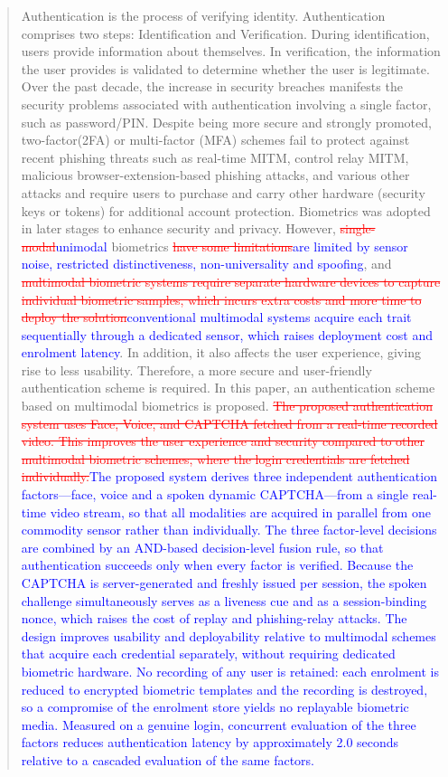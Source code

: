 \documentclass[10pt,journal,compsoc]{IEEEtran}
\begin{document}
\begin{@twocolumnfalse}
\begin{abstract}
    Authentication is the process of verifying identity. Authentication comprises two steps: Identification and Verification. During identification, users provide information about themselves. In verification, the information the user provides is validated to determine whether the user is legitimate. Over the past decade, the increase in security breaches manifests the security problems associated with authentication involving a single factor, such as password/PIN. Despite being more secure and strongly promoted, two-factor(2FA) or multi-factor (MFA) schemes fail to protect against recent phishing threats such as real-time MITM, control relay MITM, malicious browser-extension-based phishing attacks, and various other attacks and require users to purchase and carry other hardware (security keys or tokens) for additional account protection. Biometrics was adopted in later stages to enhance security and privacy. However, \textcolor{red}{\sout{single-modal}}\textcolor{blue}{unimodal} biometrics \textcolor{red}{\sout{have some limitations}}\textcolor{blue}{are limited by sensor noise, restricted distinctiveness, non-universality and spoofing}, and \textcolor{red}{\sout{multimodal biometric systems require separate hardware devices to capture individual biometric samples, which incurs extra costs and more time to deploy the solution}}\textcolor{blue}{conventional multimodal systems acquire each trait sequentially through a dedicated sensor, which raises deployment cost and enrolment latency}. In addition, it also affects the user experience, giving rise to less usability. Therefore, a more secure and user-friendly authentication scheme is required. In this paper, an authentication scheme based on multimodal biometrics is proposed. \textcolor{red}{\sout{The proposed authentication system uses Face, Voice, and CAPTCHA fetched from a real-time recorded video. This improves the user experience and security compared to other multimodal biometric schemes, where the login credentials are fetched individually.}}\textcolor{blue}{The proposed system derives three independent authentication factors---face, voice and a spoken dynamic CAPTCHA---from a single real-time video stream, so that all modalities are acquired in parallel from one commodity sensor rather than individually. The three factor-level decisions are combined by an AND-based decision-level fusion rule, so that authentication succeeds only when every factor is verified. Because the CAPTCHA is server-generated and freshly issued per session, the spoken challenge simultaneously serves as a liveness cue and as a session-binding nonce, which raises the cost of replay and phishing-relay attacks. The design improves usability and deployability relative to multimodal schemes that acquire each credential separately, without requiring dedicated biometric hardware. No recording of any user is retained: each enrolment is reduced to encrypted biometric templates and the recording is destroyed, so a compromise of the enrolment store yields no replayable biometric media. Measured on a genuine login, concurrent evaluation of the three factors reduces authentication latency by approximately 2.0 seconds relative to a cascaded evaluation of the same factors.}

\end{abstract}
\end{@twocolumnfalse}
\end{document}
